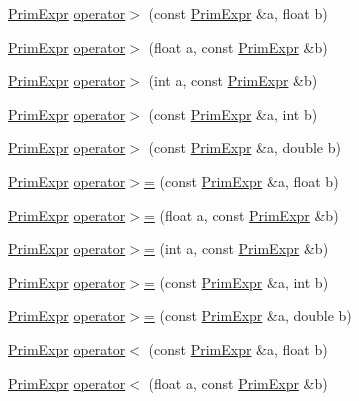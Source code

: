 \begin{DoxyCompactItemize}
\item 
\hyperlink{classtvm_1_1PrimExpr}{Prim\+Expr} \hyperlink{namespacetvm_a9cea8f3789d8f3dc78acae43e9a6aad6}{operator$>$} (const \hyperlink{classtvm_1_1PrimExpr}{Prim\+Expr} \&a, float b)
\item 
\hyperlink{classtvm_1_1PrimExpr}{Prim\+Expr} \hyperlink{namespacetvm_a6d0ad14c882c11311836138a2c164cf3}{operator$>$} (float a, const \hyperlink{classtvm_1_1PrimExpr}{Prim\+Expr} \&b)
\item 
\hyperlink{classtvm_1_1PrimExpr}{Prim\+Expr} \hyperlink{namespacetvm_a6aeb6ed068c5de8ab908ff234337aeeb}{operator$>$} (int a, const \hyperlink{classtvm_1_1PrimExpr}{Prim\+Expr} \&b)
\item 
\hyperlink{classtvm_1_1PrimExpr}{Prim\+Expr} \hyperlink{namespacetvm_acc92dcd3d81981e983ddf05347bc9371}{operator$>$} (const \hyperlink{classtvm_1_1PrimExpr}{Prim\+Expr} \&a, int b)
\item 
\hyperlink{classtvm_1_1PrimExpr}{Prim\+Expr} \hyperlink{namespacetvm_a7e2181bca182f90533ec35537714d09d}{operator$>$} (const \hyperlink{classtvm_1_1PrimExpr}{Prim\+Expr} \&a, double b)
\item 
\hyperlink{classtvm_1_1PrimExpr}{Prim\+Expr} \hyperlink{namespacetvm_a35961a6074b72fae0dfc48ee395e0673}{operator$>$=} (const \hyperlink{classtvm_1_1PrimExpr}{Prim\+Expr} \&a, float b)
\item 
\hyperlink{classtvm_1_1PrimExpr}{Prim\+Expr} \hyperlink{namespacetvm_a7a94a354cd62137652e09fa887a96100}{operator$>$=} (float a, const \hyperlink{classtvm_1_1PrimExpr}{Prim\+Expr} \&b)
\item 
\hyperlink{classtvm_1_1PrimExpr}{Prim\+Expr} \hyperlink{namespacetvm_af7dee311b945dfc5a821a119c1db9ad1}{operator$>$=} (int a, const \hyperlink{classtvm_1_1PrimExpr}{Prim\+Expr} \&b)
\item 
\hyperlink{classtvm_1_1PrimExpr}{Prim\+Expr} \hyperlink{namespacetvm_ac194836fc11a8ba34e44738da17fd116}{operator$>$=} (const \hyperlink{classtvm_1_1PrimExpr}{Prim\+Expr} \&a, int b)
\item 
\hyperlink{classtvm_1_1PrimExpr}{Prim\+Expr} \hyperlink{namespacetvm_aae1dcfef78728c5490d3c107b4abac5a}{operator$>$=} (const \hyperlink{classtvm_1_1PrimExpr}{Prim\+Expr} \&a, double b)
\item 
\hyperlink{classtvm_1_1PrimExpr}{Prim\+Expr} \hyperlink{namespacetvm_a4c5092e248ab7daa5de5c22717670d8e}{operator$<$} (const \hyperlink{classtvm_1_1PrimExpr}{Prim\+Expr} \&a, float b)
\item 
\hyperlink{classtvm_1_1PrimExpr}{Prim\+Expr} \hyperlink{namespacetvm_abc5d3aba4f3f15098d5ac2fb0c3dfd39}{operator$<$} (float a, const \hyperlink{classtvm_1_1PrimExpr}{Prim\+Expr} \&b)

\end{DoxyCompactItemize}
